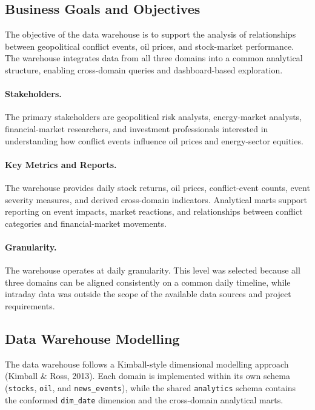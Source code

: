 \documentclass[11pt,a4paper]{article}
\begin{document}
\subsection{Business Goals and Objectives}
\label{sec:business_goals}

The objective of the data warehouse is to support the analysis of
relationships between geopolitical conflict events, oil prices, and
stock-market performance. The warehouse integrates data from all three
domains into a common analytical structure, enabling cross-domain
queries and dashboard-based exploration.

\paragraph{Stakeholders.}
The primary stakeholders are geopolitical risk analysts, energy-market
analysts, financial-market researchers, and investment professionals
interested in understanding how conflict events influence oil prices
and energy-sector equities.

\paragraph{Key Metrics and Reports.}
The warehouse provides daily stock returns, oil prices, conflict-event
counts, event severity measures, and derived cross-domain indicators.
Analytical marts support reporting on event impacts, market reactions,
and relationships between conflict categories and financial-market
movements.

\paragraph{Granularity.}
The warehouse operates at daily granularity. This level was selected
because all three domains can be aligned consistently on a common
daily timeline, while intraday data was outside the scope of the
available data sources and project requirements.

\subsection{Data Warehouse Modelling}
\label{sec:dw_modelling}

The data warehouse follows a Kimball-style dimensional modelling
approach (Kimball \& Ross, 2013). Each domain is implemented within its
own schema (\texttt{stocks}, \texttt{oil}, and
\texttt{news\_events}), while the shared \texttt{analytics} schema
contains the conformed \texttt{dim\_date} dimension and the
cross-domain analytical marts.
\end{document}
